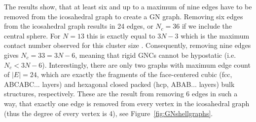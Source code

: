 The results show, that at least six and up to a maximum of nine edges have to
be removed from the icosahedral graph to create a GN graph. Removing six edges
from the icosahedral graph results in 24 edges, or $N_c=36$ if we include the
central sphere. For $N=13$ this is exactly equal to $3N-3$ which is the maximum
contact number observed for this cluster size
\autocite{Hoy_Structuredynamicsmodel_2015,Holmes-Cerfon_EnumeratingRigidSphere_2016}.
Consequently, removing nine edges gives $N_c=33=3N-6$, meaning that rigid GNCs
cannot be hypostatic (i.e. $N_c < 3N-6$). Interestingly, there are only two
graphs with maximum edge count of $|E|=24$, which are exactly the fragments of
the face-centered cubic (fcc, ABCABC... layers) and hexagonal closed packed
(hcp, ABAB... layers) bulk structures, respectively. These are the result from
removing 6 edges in such a way, that exactly one edge is removed from every
vertex in the icosahedral graph (thus the degree of every vertex is 4), see
Figure~\ref{fig:GNshellgraphs}.
